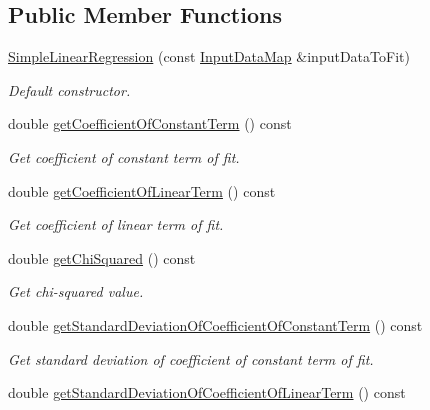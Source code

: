 \subsection*{Public Member Functions}
\begin{DoxyCompactItemize}
\item 
\hyperlink{classtudat_1_1statistics_1_1SimpleLinearRegression_a2d09fdde5720ce6c4dea482becbcfa9b}{Simple\+Linear\+Regression} (const \hyperlink{classtudat_1_1statistics_1_1SimpleLinearRegression_aeec88aae0a92c1f4c90c6e736111724c}{Input\+Data\+Map} \&input\+Data\+To\+Fit)
\begin{DoxyCompactList}\small\item\em Default constructor. \end{DoxyCompactList}\item 
double \hyperlink{classtudat_1_1statistics_1_1SimpleLinearRegression_aca28e521b00a6fd12500681a9a293434}{get\+Coefficient\+Of\+Constant\+Term} () const 
\begin{DoxyCompactList}\small\item\em Get coefficient of constant term of fit. \end{DoxyCompactList}\item 
double \hyperlink{classtudat_1_1statistics_1_1SimpleLinearRegression_a8c6cfb0164e9ba254022dba22583996d}{get\+Coefficient\+Of\+Linear\+Term} () const 
\begin{DoxyCompactList}\small\item\em Get coefficient of linear term of fit. \end{DoxyCompactList}\item 
double \hyperlink{classtudat_1_1statistics_1_1SimpleLinearRegression_aca2876abac878e34ff4e6d2a1f8b733a}{get\+Chi\+Squared} () const 
\begin{DoxyCompactList}\small\item\em Get chi-\/squared value. \end{DoxyCompactList}\item 
double \hyperlink{classtudat_1_1statistics_1_1SimpleLinearRegression_ad5c826cf321432e60d74ac2809c636d7}{get\+Standard\+Deviation\+Of\+Coefficient\+Of\+Constant\+Term} () const 
\begin{DoxyCompactList}\small\item\em Get standard deviation of coefficient of constant term of fit. \end{DoxyCompactList}\item 
double \hyperlink{classtudat_1_1statistics_1_1SimpleLinearRegression_a8770eb0f2432f3232bfcc5456bb9691f}{get\+Standard\+Deviation\+Of\+Coefficient\+Of\+Linear\+Term} () const 

\end{DoxyCompactItemize}
